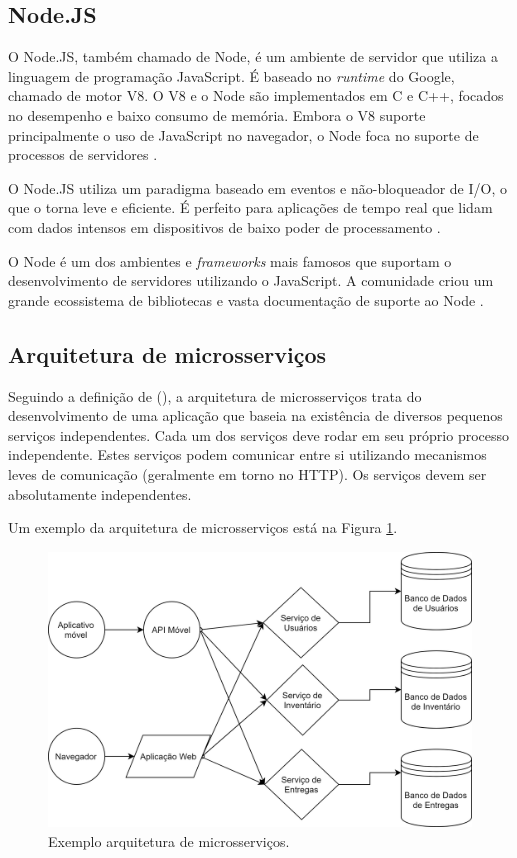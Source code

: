 \subsection{Node.JS}

O Node.JS, também chamado de Node, é um ambiente de servidor que utiliza a linguagem de programação JavaScript. É baseado no \textit{runtime} do Google, chamado de motor V8. O V8 e o Node são implementados em C e C++, focados no desempenho e baixo consumo de memória. Embora o V8 suporte principalmente o uso de JavaScript no navegador, o Node foca no suporte de processos de servidores \cite{Tilkov2010}.

O Node.JS utiliza um paradigma baseado em eventos e não-bloqueador de I/O, o que o torna leve e eficiente. É perfeito para aplicações de tempo real que lidam com dados intensos em dispositivos de baixo poder de processamento \cite{Sapes2016}.

O Node é um dos ambientes e \textit{frameworks} mais famosos que suportam o desenvolvimento de servidores utilizando o JavaScript. A comunidade criou um grande ecossistema de bibliotecas e vasta documentação de suporte ao Node \cite{Tilkov2010}.

\subsection{Arquitetura de microsserviços}

Seguindo a definição de \citeauthor{ms1} (\citeyear{ms1}), a arquitetura de microsserviços trata do desenvolvimento de uma aplicação que baseia na existência de diversos pequenos serviços independentes. Cada um dos serviços deve rodar em seu próprio processo independente. Estes serviços podem comunicar entre si utilizando mecanismos leves de comunicação (geralmente em torno no HTTP). Os serviços devem ser absolutamente independentes.

Um exemplo da arquitetura de microsserviços está na Figura \ref{fig:arquitetura-microsservicos}.

\begin{figure}[htbp]
	\centering
	\includegraphics[width=1\linewidth]{figuras/microservices.png}
	\caption{Exemplo arquitetura de microsserviços.}
	\label{fig:arquitetura-microsservicos}
\end{figure}

